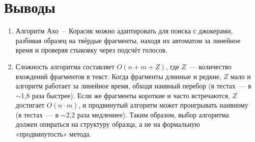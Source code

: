 \section{Выводы}
\begin{enumerate}
  \item Алгоритм Ахо~--~Корасик можно адаптировать для поиска с
        джокерами, разбивая образец на твёрдые фрагменты, находя их
        автоматом за линейное время и проверяя стыковку через подсчёт
        голосов.

  \item Сложность алгоритма составляет $O(n + m + Z)$, где $Z$~---
        количество вхождений фрагментов в текст. Когда фрагменты
        длинные и редкие, $Z$ мало и алгоритм работает за линейное
        время, обходя наивный перебор (в тестах~--- в $\sim$1{,}8
        раза быстрее). Если же фрагменты короткие и часто
        встречаются, $Z$ достигает $O(n \cdot m)$, и продвинутый
        алгоритм может проигрывать наивному (в тестах~--- в $\sim$2{,}2
        раза медленнее). Таким образом, выбор алгоритма должен
        опираться на структуру образца, а не на формальную
        «продвинутость» метода.
\end{enumerate}
\pagebreak